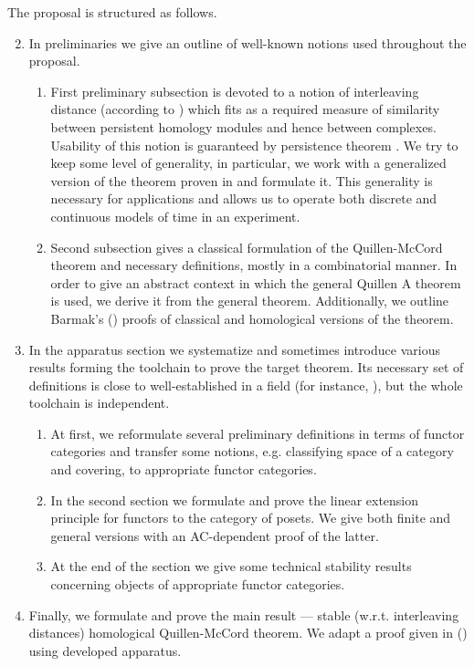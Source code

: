 \documentclass[english,12pt]{article}
\numberwithin{equation}{section}
\theoremstyle{definition}
\theoremstyle{remark}
\begin{document}
The proposal is structured as follows.
\begin{enumerate}
  \setcounter{enumi}{1}
  \item In preliminaries we give an outline of well-known notions used throughout the proposal.
  \begin{enumerate}[label*=\arabic*.]
    \item First preliminary subsection is devoted to a notion of interleaving distance (according to {\cite{GS16}}) which fits as a required measure of similarity between persistent homology modules and hence between complexes. Usability of this notion is guaranteed by persistence theorem {\cite{Zomorodian05}}. We try to keep some level of generality, in particular, we work with a generalized version of the theorem proven in {\cite{Corbet18}} and formulate it. This generality is necessary for applications and allows us to operate both discrete and continuous models of time in an experiment.
    \item Second subsection gives a classical formulation of the Quillen-McCord theorem and necessary definitions, mostly in a combinatorial manner. In order to give an abstract context in which the general Quillen A theorem {\cite{Quillen72}} is used, we derive it from the general theorem. Additionally, we outline Barmak's ({\cite{Bar11}}) proofs of classical and homological versions of the theorem.
  \end{enumerate}
  \item In the apparatus section we systematize and sometimes introduce various results forming the toolchain to prove the target theorem. Its necessary set of definitions is close to well-established in a field (for instance, {\cite{Bubenik15}}), but the whole toolchain is independent.
  \begin{enumerate}[label*=\arabic*.]
    \item At first, we reformulate several preliminary definitions in terms of functor categories and transfer some notions, e.g. classifying space of a category and covering, to appropriate functor categories.
    \item In the second section we formulate and prove the linear extension principle for functors to the category of posets. We give both finite and general versions with an AC-dependent proof of the latter.
    \item At the end of the section we give some technical stability results concerning objects of appropriate functor categories.
  \end{enumerate}
  \item Finally, we formulate and prove the main result --- stable (w.r.t. interleaving distances) homological Quillen-McCord theorem. We adapt a proof given in ({\cite{Bar11}}) using developed apparatus.
\end{enumerate}
\end{document}
